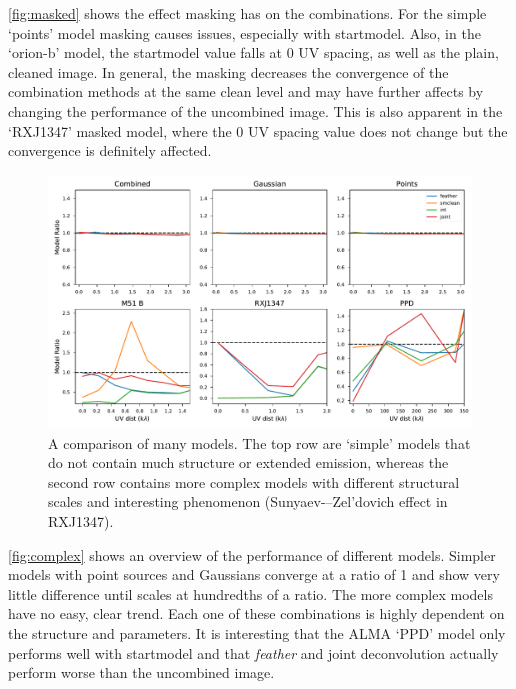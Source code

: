 \documentclass[manuscript,linenumbers]{aastex62}
\begin{document}
\autoref{fig:masked} shows the effect masking has on the combinations. For the simple `points' model masking causes issues, especially with startmodel. Also, in the `orion-b' model, the startmodel value falls at \num{0} UV spacing, as well as the plain, cleaned image. In general, the masking decreases the convergence of the combination methods at the same clean level and may have further affects by changing the performance of the uncombined image. This is also apparent in the `RXJ1347' masked model, where the \num{0} UV spacing value does not change but the convergence is definitely affected.


\begin{figure}[ht]
    \includegraphics[width=\textwidth]{figures/complexity-plot}
    \caption{A comparison of many models. The top row are `simple' models that do not contain much structure or extended emission, whereas the second row contains more complex models with different structural scales and interesting phenomenon (Sunyaev-–Zel'dovich effect in RXJ1347).}
    \label{fig:complex}
\end{figure}

\autoref{fig:complex} shows an overview of the performance of different models. Simpler models with point sources and Gaussians converge at a ratio of \num{1} and show very little difference until scales at hundredths of a ratio. The more complex models have no easy, clear trend. Each one of these combinations is highly dependent on the structure and parameters. It is interesting that the ALMA `PPD' model only performs well with startmodel and that \textit{feather} and joint deconvolution actually perform worse than the uncombined image. 
\end{document}
